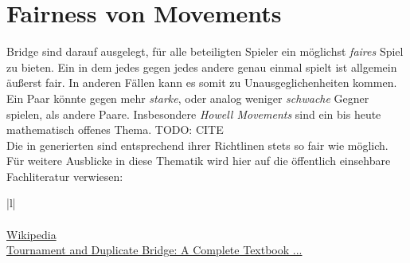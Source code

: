 \section{Fairness von Movements}\label{fairness}

\noindent
Bridge \bms sind darauf ausgelegt, für alle beteiligten Spieler ein möglichst
\textit{faires} Spiel zu bieten. Ein \bms in dem jedes \pa gegen jedes andere
\pa genau einmal spielt ist allgemein äußerst fair. In anderen Fällen kann es somit zu
Unausgeglichenheiten kommen. Ein Paar könnte gegen mehr \textit{starke}, oder
analog weniger \textit{schwache} Gegner spielen, als andere Paare.
Insbesondere \textit{Howell Movements} sind ein bis heute mathematisch offenes Thema. TODO: CITE\\[.2cm]

\noindent
Die in \bb generierten \bms sind entsprechend ihrer Richtlinen stets so fair wie möglich.\\[.1cm]
Für weitere Ausblicke in diese Thematik wird hier auf die öffentlich einsehbare Fachliteratur verwiesen:

\begin{center}
  \begin{tabular}{|l|}
    \hline
    \\
    \hline
    \\
    \hline\hline
    \href{https://en.wikipedia.org/wiki/Duplicate_bridge_movements#Fairness_of_Bridge_Movements}{Wikipedia}\\
    \hdashline
    \href{https://books.google.de/books/about/Tournament_and_Duplicate_Bridge.html?id=UCPwAAAAMAAJ&redir_esc=y}{Tournament and Duplicate Bridge: A Complete Textbook ...}\\
    \hline
  \end{tabular}
\end{center}
